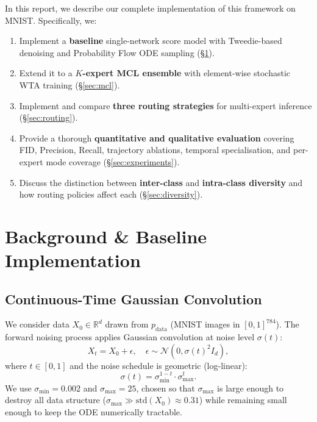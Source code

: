 \documentclass[11pt,a4paper]{article}
\newcommand{\R}{\mathbb{R}}
\newcommand{\N}{\mathcal{N}}
\newcommand{\Id}{I_d}
\begin{document}
In this report, we describe our complete implementation of this framework
on MNIST. Specifically, we:
\begin{enumerate}[nosep]
  \item Implement a \textbf{baseline} single-network score model with
    Tweedie-based denoising and Probability Flow ODE sampling
    (\S\ref{sec:baseline}).
  \item Extend it to a \textbf{$K$-expert MCL ensemble} with
    element-wise stochastic WTA training (\S\ref{sec:mcl}).
  \item Implement and compare \textbf{three routing strategies} for
    multi-expert inference (\S\ref{sec:routing}).
  \item Provide a thorough \textbf{quantitative and qualitative evaluation}
    covering FID, Precision, Recall, trajectory ablations, temporal
    specialisation, and per-expert mode coverage (\S\ref{sec:experiments}).
  \item Discuss the distinction between \textbf{inter-class} and
    \textbf{intra-class diversity} and how routing policies affect each
    (\S\ref{sec:diversity}).
\end{enumerate}

\section{Background \& Baseline Implementation}
\label{sec:baseline}

\subsection{Continuous-Time Gaussian Convolution}

We consider data $X_0 \in \R^d$ drawn from $p_{\text{data}}$ (MNIST images
in $[0,1]^{784}$). The forward noising process applies Gaussian convolution
at noise level $\sigma(t)$:
\begin{equation}
  X_t = X_0 + \epsilon, \quad \epsilon \sim \N(0, \sigma(t)^2 \Id),
  \label{eq:forward}
\end{equation}
where $t \in [0, 1]$ and the noise schedule is geometric (log-linear):
\begin{equation}
  \sigma(t) = \sigma_{\min}^{1-t} \cdot \sigma_{\max}^{t}.
  \label{eq:schedule}
\end{equation}
We use $\sigma_{\min} = 0.002$ and $\sigma_{\max} = 25$, chosen so that
$\sigma_{\max}$ is large enough to destroy all data structure
($\sigma_{\max} \gg \text{std}(X_0) \approx 0.31$) while remaining small
enough to keep the ODE numerically tractable.
\end{document}
